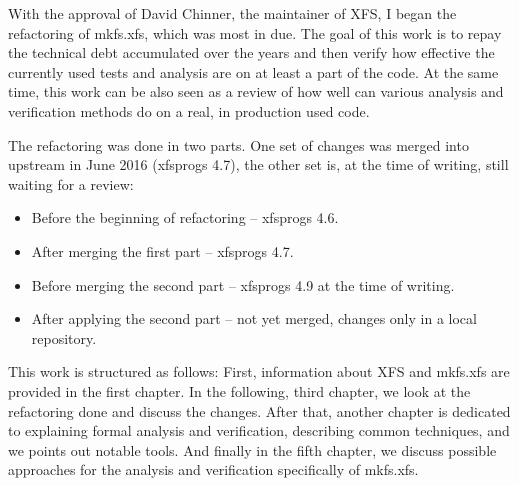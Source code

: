 With the approval of David Chinner, the maintainer of XFS, I began the
refactoring of mkfs.xfs, which was most in due. The goal of this work is to repay the technical debt accumulated over the years and then verify how effective the currently used tests and analysis are on at least a part of the code. At the same time, this work can be also seen as a review of how well can various analysis and verification methods do on a real, in production used code.

The refactoring was done in two parts. One set of changes was merged into upstream in June 2016 (xfsprogs 4.7), the other set is, at the time of writing, still waiting for a review:
\begin{itemize}
\item Before the beginning of refactoring -- xfsprogs 4.6.
\item After merging the first part -- xfsprogs 4.7.
\item Before merging the second part -- xfsprogs 4.9 at the time of writing.
\item After applying the second part -- not yet merged, changes only in a local repository.
\end{itemize}

This work is structured as follows: First, information about XFS and
mkfs.xfs are provided in the first chapter. In the following, third chapter, we look
at the refactoring done and discuss the changes. After that, another
chapter is dedicated to explaining formal analysis and verification,
describing common techniques, and we points out notable tools. And finally
in the fifth chapter, we discuss possible approaches for the analysis and
verification specifically of mkfs.xfs.

